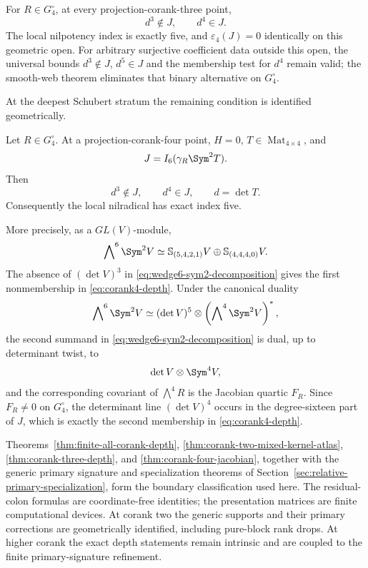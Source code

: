 \begin{theorem}
\label{thm:corank-three-depth}
For \(R\in G_4^\circ\), at every projection-corank-three point,
\begin{equation}\label{eq:corank3-no-d3}
 d^3\notin J,\qquad d^4\in J.
\end{equation}
The local nilpotency index is exactly five, and
\(\varepsilon_4(J)=0\) identically on this geometric open.
For arbitrary surjective coefficient data outside this open, the
universal bounds \(d^3\notin J\), \(d^5\in J\) and the membership
test for \(d^4\) remain valid; the smooth-web theorem eliminates
that binary alternative on \(G_4^\circ\).
\end{theorem}

At the deepest Schubert stratum the remaining condition is identified
geometrically.

\begin{theorem}
\label{thm:corank-four-jacobian}
Let \(R\in G_4^\circ\).  At a projection-corank-four point,
\(H=0\), \(T\in\operatorname{Mat}_{4\times4}\), and
\[
 J=I_6(\gamma_R\Sym^2T).
\]
Then
\begin{equation}\label{eq:corank4-depth}
 d^3\notin J,\qquad d^4\in J,\qquad d=\det T.
\end{equation}
Consequently the local nilradical has exact index five.

More precisely, as a \(GL(V)\)-module,
\begin{equation}\label{eq:wedge6-sym2-decomposition}
 \bigwedge\nolimits^6\Sym^2V
 \simeq
 \mathbb S_{(5,4,2,1)}V
 \oplus
 \mathbb S_{(4,4,4,0)}V.
\end{equation}
The absence of \((\det V)^3\) in
\eqref{eq:wedge6-sym2-decomposition} gives the first
nonmembership in \eqref{eq:corank4-depth}.  Under the canonical
duality
\[
 \bigwedge\nolimits^6\Sym^2V
 \simeq
 (\det V)^5\otimes
 \left(\bigwedge\nolimits^4\Sym^2V\right)^*,
\]
the second summand in \eqref{eq:wedge6-sym2-decomposition} is dual,
up to determinant twist, to
\[
 \det V\otimes\Sym^4V,
\]
and the corresponding covariant of \(\bigwedge^4R\) is the Jacobian
quartic \(F_R\).  Since \(F_R\ne0\) on \(G_4^\circ\), the determinant
line \((\det V)^4\) occurs in the degree-sixteen part of \(J\), which
is exactly the second membership in
\eqref{eq:corank4-depth}.
\end{theorem}

Theorems~\ref{thm:finite-all-corank-depth},
\ref{thm:corank-two-mixed-kernel-atlas},
\ref{thm:corank-three-depth}, and
\ref{thm:corank-four-jacobian}, together with the generic primary
signature and specialization theorems of
Section~\ref{sec:relative-primary-specialization}, form the boundary
classification used here.  The residual-colon formulas
are coordinate-free identities; the presentation matrices are finite
computational devices.  At corank two the generic supports and their
primary corrections are geometrically identified, including pure-block
rank drops.  At higher corank the exact depth statements remain
intrinsic and are coupled to the finite primary-signature refinement.
